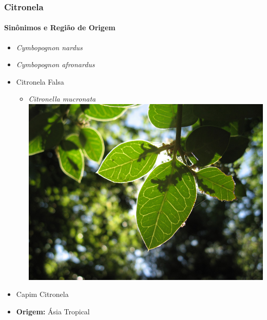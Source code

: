 \documentclass[aspectratio=169]{beamer}
\begin{document}
\begin{frame}
\frametitle{Citronela}
\framesubtitle{Sinônimos e Região de Origem}
	\begin{minipage}{0.49\textwidth}
		\begin{itemize}
			\item	\emph{Cymbopognon nardus} \pause
			\item \emph{Cymbopognon afronardus} \pause
			\item Citronela Falsa \pause
			
			\begin{itemize}
				\item \emph{Citronella mucronata} \includegraphics[scale=0.4]{imgs/mucronata.jpg} \pause
			\end{itemize}		
			
			\item Capim Citronela \pause
			
			\item  \textbf{Origem: } Ásia Tropical
		\end{itemize}
	\end{minipage}
	
	\begin{minipage}{0.49\textwidth}
		
	\end{minipage}

\end{frame}
\end{document}
